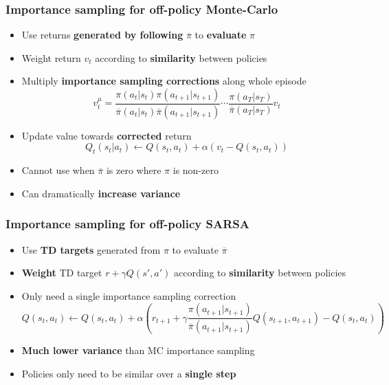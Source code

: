 \subsubsection{Importance sampling for off-policy Monte-Carlo}
    \begin{itemize}
        \item Use returns \textbf{generated by following} $\overline{\pi}$ to \textbf{evaluate} $\pi$
        \item Weight return $v_t$ according to \textbf{similarity} between policies
        \item Multiply \textbf{importance sampling corrections} along whole episode
        $$v_t^\mu=\frac{\pi(a_t|s_t)\pi(a_{t+1}|s_{t+1})}{\overline{\pi}(a_t|s_t)\overline{\pi}(a_{t+1}|s_{t+1})}\cdots\frac{\pi(a_T|s_T)}{\overline{\pi}(a_T|s_T)}v_t$$
        \item Update value towards \textbf{corrected} return
        $$Q_t(s_t|a_t)\leftarrow Q(s_t,a_t)+\alpha(v_t-Q(s_t,a_t))$$
        \item Cannot use when $\overline{\pi}$ is zero where $\pi$ is non-zero
        \item Can dramatically \textbf{increase variance}
    \end{itemize}
\subsubsection{Importance sampling for off-policy SARSA}
    \begin{itemize}
        \item Use \textbf{TD targets} generated from $\pi$ to evaluate $\overline{\pi}$
        \item \textbf{Weight} TD target $r+\gamma Q(s',a')$ according to \textbf{similarity} between policies
        \item Only need a single importance sampling correction
        $$Q(s_t,a_t)\leftarrow Q(s_t,a_t)+\alpha\left(r_{t+1}+\gamma\frac{\pi(a_{t+1}|s_{t+1})}{\overline{\pi}(a_{t+1}|s_{t+1})}Q(s_{t+1},a_{t+1})-Q(s_t,a_t)\right)$$
        \item \textbf{Much lower variance} than MC importance sampling
        \item Policies only need to be similar over a \textbf{single step}
    \end{itemize}

